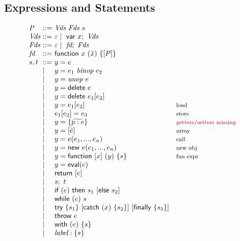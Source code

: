 \documentclass[a4paper, leqno]{amsart}
\newcommand{\cmt}[1]{\mbox{\footnotesize #1}}
\newcommand{\jsdel}{\textsf{delete}}
\newcommand{\jsvar}[1]{\textsf{var} \ #1}
\newcommand{\jsreturn}[1]{\textsf{return} \ #1}
\newcommand{\jsthrow}[1]{\textsf{throw} \ #1}
\newcommand{\jseval}[1]{\textsf{eval}(#1)}
\newcommand{\jsifelseopt}[3]{\textsf{if} \ (#1) \ \textsf{then} \ #2 \ [\textsf{else} \ #3]}
\newcommand{\jswhile}[2]{\textsf{while} \ (#1) \ #2}
\newcommand{\jsnew}[2]{\textsf{new} \ #1(#2)}
\newcommand{\jsfunc}[3]{\textsf{function} \ #1 \ (#2) \ \{ #3\}}
\newcommand{\jstryopt}[4]{\textsf{try} \ \{#1\} \ [\textsf{catch} \ (#2) \ \{#3\}] \ [\textsf{finally} \ \{#4\}]}
\newcommand{\jswith}[2]{\textsf{with} \ (#1) \ \{#2\}}
\def\inred{\color{red}}
\begin{document}
\subsection{Expressions and Statements}
\begin{multicols}{2}
\[
\begin{array}{l@{}l@{}ll}
\emph{P} & \ ::= \ & \emph{Vds} \ \emph{Fds} \ s & \cmt{}\\
\emph{Vds} & \ ::= \ & \varepsilon \mid \ \jsvar{x}; \ \emph{Vds} & \cmt{}\\
\emph{Fds} & \ ::= \ & \varepsilon \mid \ \emph{fd}; \ \emph{Fds} & \cmt{}\\
\emph{fd} & \ ::= \ & \jsfunc{x}{\tilde{x}}{[P]} & \cmt{}\\
s,t & \ ::= \ & y = e & \cmt{}\\
 & \ \mid \ & y = e_1\ \emph{binop}\ e_2  & \cmt{}\\
 & \ \mid \ & y = \emph{unop}\ e & \cmt{}\\
 & \ \mid \ & y = \jsdel\ e & \cmt{}\\
 & \ \mid \ & y = \jsdel\ e_1[e_2] & \cmt{}\\
 & \ \mid \ & y = e_1[e_2] & \cmt{load}\\
 & \ \mid \ & e_1[e_2] = e_3 & \cmt{store}\\
 & \ \mid \ & y = \{ \widetilde{p:e} \} & \cmt{\inred getters/setters missing}\\
 & \ \mid \ & y = [\tilde{e}] & \cmt{array}\\
 & \ \mid \ & y = e(e_1, ..., e_n) & \cmt{call}\\
 & \ \mid \ &  y = \jsnew{e}{e_1, ..., e_n} & \cmt{new obj}\\
 & \ \mid \ & y = \jsfunc{[x]}{y}{s} & \cmt{fun expr}\\ 
 & \ \mid \ & y = \jseval{e} & \cmt{}\\
 & \ \mid \ & \jsreturn{[e]} & \cmt{}\\
 & \ \mid \ & s; \ t & \cmt{}\\
 & \ \mid \ & \jsifelseopt{e}{s_1}{s_2} & \cmt{}\\
 & \ \mid \ & \jswhile{e}{s} & \cmt{}\\
 & \ \mid \ & \jstryopt{s_1}{x}{s_2}{s_3} & \cmt{}\\
 & \ \mid \ & \jsthrow{e} & \cmt{}\\
 & \ \mid \ & \jswith{e}{s} & \cmt{}\\
 & \ \mid \ & \emph{label} : \{s\} & \cmt{}\\

\end{array}\]
\end{multicols}
\end{document}
